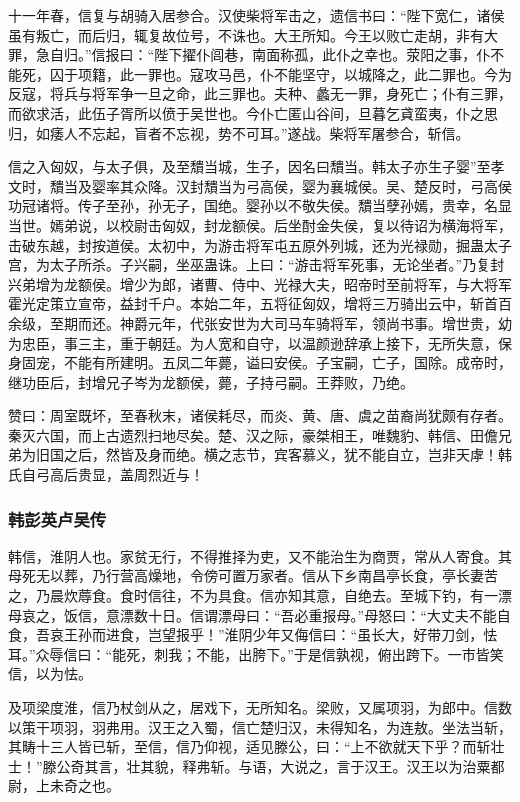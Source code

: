 \documentclass[]{article}
\begin{document}
十一年春，信复与胡骑入居参合。汉使柴将军击之，遗信书曰：``陛下宽仁，诸侯虽有叛亡，而后归，辄复故位号，不诛也。大王所知。今王以败亡走胡，非有大罪，急自归。''信报曰：``陛下擢仆闾巷，南面称孤，此仆之幸也。荥阳之事，仆不能死，囚于项籍，此一罪也。寇攻马邑，仆不能坚守，以城降之，此二罪也。今为反寇，将兵与将军争一旦之命，此三罪也。夫种、蠡无一罪，身死亡；仆有三罪，而欲求活，此伍子胥所以偾于吴世也。今仆亡匿山谷间，旦暮乞貣蛮夷，仆之思归，如痿人不忘起，盲者不忘视，势不可耳。''遂战。柴将军屠参合，斩信。

信之入匈奴，与太子俱，及至穨当城，生子，因名曰穨当。韩太子亦生子婴''至孝文时，穨当及婴率其众降。汉封穨当为弓高侯，婴为襄城侯。吴、楚反时，弓高侯功冠诸将。传子至孙，孙无子，国绝。婴孙以不敬失侯。穨当孽孙嫣，贵幸，名显当世。嫣弟说，以校尉击匈奴，封龙额侯。后坐酎金失侯，复以待诏为横海将军，击破东越，封按道侯。太初中，为游击将军屯五原外列城，还为光禄勋，掘蛊太子宫，为太子所杀。子兴嗣，坐巫蛊诛。上曰：``游击将军死事，无论坐者。''乃复封兴弟增为龙额侯。增少为郎，诸曹、侍中、光禄大夫，昭帝时至前将军，与大将军霍光定策立宣帝，益封千户。本始二年，五将征匈奴，增将三万骑出云中，斩首百余级，至期而还。神爵元年，代张安世为大司马车骑将军，领尚书事。增世贵，幼为忠臣，事三主，重于朝廷。为人宽和自守，以温颜逊辞承上接下，无所失意，保身固宠，不能有所建明。五凤二年薨，谥曰安侯。子宝嗣，亡子，国除。成帝时，继功臣后，封增兄子岑为龙额侯，薨，子持弓嗣。王莽败，乃绝。

赞曰：周室既坏，至春秋末，诸侯耗尽，而炎、黄、唐、虞之苗裔尚犹颇有存者。秦灭六国，而上古遗烈扫地尽矣。楚、汉之际，豪桀相王，唯魏豹、韩信、田儋兄弟为旧国之后，然皆及身而绝。横之志节，宾客慕义，犹不能自立，岂非天虖！韩氏自弓高后贵显，盖周烈近与！

\hypertarget{header-n3520}{%
\subsubsection{韩彭英卢吴传}\label{header-n3520}}

韩信，淮阴人也。家贫无行，不得推择为吏，又不能治生为商贾，常从人寄食。其母死无以葬，乃行营高燥地，令傍可置万家者。信从下乡南昌亭长食，亭长妻苦之，乃晨炊蓐食。食时信往，不为具食。信亦知其意，自绝去。至城下钓，有一漂母哀之，饭信，意漂数十日。信谓漂母曰：``吾必重报母。''母怒曰：``大丈夫不能自食，吾哀王孙而进食，岂望报乎！''淮阴少年又侮信曰：``虽长大，好带刀剑，怯耳。''众辱信曰：``能死，刺我；不能，出胯下。''于是信孰视，俯出跨下。一市皆笑信，以为怯。

及项梁度淮，信乃杖剑从之，居戏下，无所知名。梁败，又属项羽，为郎中。信数以策干项羽，羽弗用。汉王之入蜀，信亡楚归汉，未得知名，为连敖。坐法当斩，其畴十三人皆已斩，至信，信乃仰视，适见滕公，曰：``上不欲就天下乎？而斩壮士！''滕公奇其言，壮其貌，释弗斩。与语，大说之，言于汉王。汉王以为治粟都尉，上未奇之也。
\end{document}
